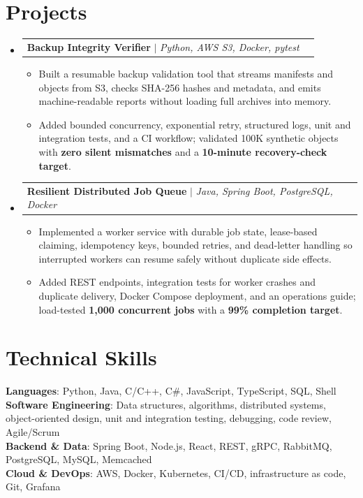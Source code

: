 \documentclass[letterpaper,11pt]{article}
\makeatletter
\newcommand{\resumeItem}[1]{
  \item\small{
    {#1 \vspace{-2pt}}
  }
}
\newcommand{\resumeProjectHeading}[2]{
    \item
    \begin{tabular*}{0.97\textwidth}{l@{\extracolsep{\fill}}r}
      \small#1 & #2 \\
    \end{tabular*}\vspace{-7pt}
}
\newcommand{\resumeSubHeadingListStart}{\begin{itemize}[leftmargin=0.15in, label={}]}
\newcommand{\resumeSubHeadingListEnd}{\end{itemize}}
\newcommand{\resumeItemListStart}{\begin{itemize}}
\newcommand{\resumeItemListEnd}{\end{itemize}\vspace{-5pt}}
\makeatother
\begin{document}
\section{Projects}
\resumeSubHeadingListStart
\resumeProjectHeading
{\textbf{Backup Integrity Verifier} $|$ \emph{Python, AWS S3, Docker, pytest}}{}
\resumeItemListStart
\resumeItem{Built a resumable backup validation tool that streams manifests and objects from S3, checks SHA-256 hashes and metadata, and emits machine-readable reports without loading full archives into memory.}
\resumeItem{Added bounded concurrency, exponential retry, structured logs, unit and integration tests, and a CI workflow; validated 100K synthetic objects with \textbf{zero silent mismatches} and a \textbf{10-minute recovery-check target}.}
\resumeItemListEnd
\resumeProjectHeading
{\textbf{Resilient Distributed Job Queue} $|$ \emph{Java, Spring Boot, PostgreSQL, Docker}}{}
\resumeItemListStart
\resumeItem{Implemented a worker service with durable job state, lease-based claiming, idempotency keys, bounded retries, and dead-letter handling so interrupted workers can resume safely without duplicate side effects.}
\resumeItem{Added REST endpoints, integration tests for worker crashes and duplicate delivery, Docker Compose deployment, and an operations guide; load-tested \textbf{1,000 concurrent jobs} with a \textbf{99\% completion target}.}
\resumeItemListEnd
\resumeSubHeadingListEnd


\section{Technical Skills}
\begin{itemize}[leftmargin=0.15in, label={}]
  \small{\item{
        \textbf{Languages}{: Python, Java, C/C++, C\#, JavaScript, TypeScript, SQL, Shell} \\
        \textbf{Software Engineering}{: Data structures, algorithms, distributed systems, object-oriented design, unit and integration testing, debugging, code review, Agile/Scrum} \\
        \textbf{Backend \& Data}{: Spring Boot, Node.js, React, REST, gRPC, RabbitMQ, PostgreSQL, MySQL, Memcached} \\
        \textbf{Cloud \& DevOps}{: AWS, Docker, Kubernetes, CI/CD, infrastructure as code, Git, Grafana}
        }}
\end{itemize}


\end{document}
